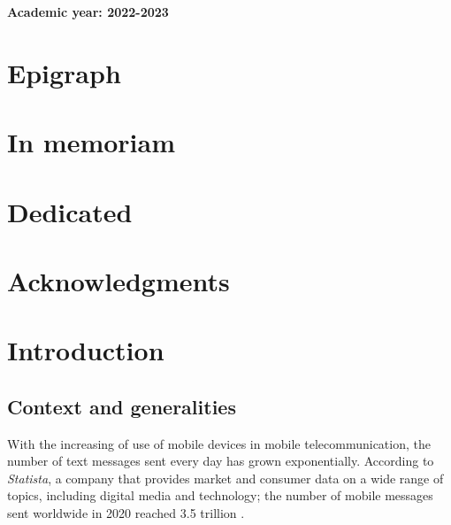 \documentclass[12pt,a4paper, oneside]{book}
\begin{document}
\begin{titlepage}
\begin {minipage}{0.5 \textwidth }
\begin{flushright}
{\begin{tabbing}
				\end{tabbing} 
			
			}					
			
		\end{flushright}
	\end{minipage}

		\begin{center} 
			\vspace*{1cm}
			\LARGE\textbf{Academic year: 2022-2023}
		\end{center}   
	\end{titlepage}   
\frontmatter
   \chapter{Epigraph}
	
	\chapter{In memoriam} 
	
	
	\chapter{Dedicated} 
	
	
	\chapter{Acknowledgments} 
	
	
 
	\tableofcontents
	\listoffigures

	\listoftables

	\mainmatter

	\chapter*{Introduction}  
	\pagestyle{plain}
	\section{Context and generalities} 
	With the increasing of use of mobile devices in mobile telecommunication, the number of text messages sent every day has grown exponentially. According to \textit{Statista}, a company that provides market and consumer data on a wide range of topics, including digital media and technology; the number of mobile messages sent worldwide in 2020 reached 3.5 trillion \cite{Statista2020}. \\
	
\end{document}
